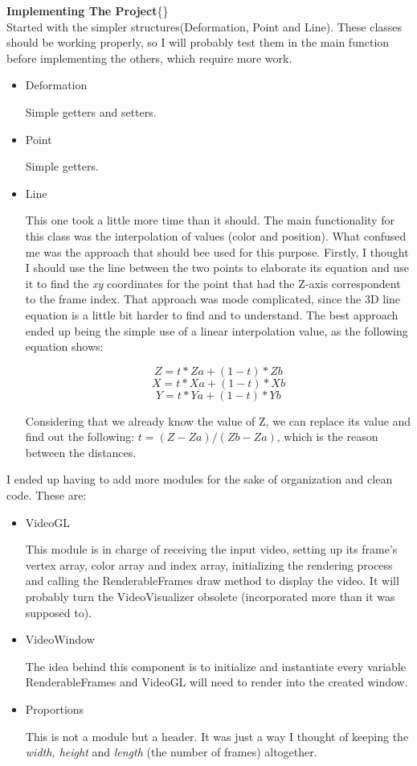 \documentclass[12pt, a4paper]{report}
\newenvironment{loggentry}[2]%
{\noindent\textbf{#2}\newline\{\marginnote{#1}\}\newline\\}{\vspace{1.0cm}}
\begin{document}
	\begin{loggentry}{(04 - 05)-06-2019}{Implementing The Project}
		Started with the simpler structures(Deformation, Point and Line).
		These classes should be working properly, so I will probably test them in the main function before implementing the others, which require more work.
		\begin{itemize}
				\item Deformation

					Simple getters and setters.
				
				\item Point

					Simple getters.			
				
				\item Line

					This one took a little more time than it should.
					The main functionality for this class was the interpolation of values (color and position).
					What confused me was the approach that should bee used for this purpose.
					Firstly, I thought I should use the line between the two points to elaborate its equation and use it to find the \textit{xy} coordinates for the point that had the Z-axis correspondent to the frame index.
					That approach was mode complicated, since the 3D line equation is a little bit harder to find and to understand.
					The best approach ended up being the simple use of a linear interpolation value, as the following equation shows:

					$$Z = t * Za + (1 - t) * Zb$$
					$$X = t * Xa + (1 - t) * Xb$$
					$$Y = t * Ya + (1 - t) * Yb$$
					
					Considering that we already know the value of Z, we can replace its value and find out the following: $t =  (Z - Za)/(Zb - Za)$, which is the reason between the distances.
		\end{itemize}
	
		I ended up having to add more modules for the sake of organization and clean code. These are:

		\begin{itemize}
				\item VideoGL

					This module is in charge of receiving the input video, setting up its frame's vertex array, color array and index array, initializing the rendering process and calling the RenderableFrames draw method to display the video.
					It will probably turn the VideoVisualizer obsolete (incorporated more than it was supposed to).

				\item VideoWindow

					The idea behind this component is to initialize and instantiate every variable RenderableFrames and VideoGL will need to render into the created window.

				\item Proportions

					This is not a module but a header.
					It was just a way I thought of keeping the \textit{width, height} and \textit{length} (the number of frames) altogether.
		\end{itemize}

	\end{loggentry}
\end{document}
